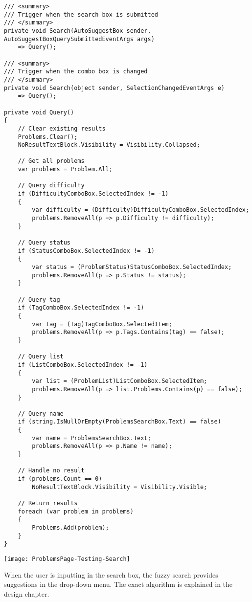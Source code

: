 \documentclass[report.tex]{subfiles}
\begin{document}
\begin{verbatim}
/// <summary>
/// Trigger when the search box is submitted
/// </summary>
private void Search(AutoSuggestBox sender, AutoSuggestBoxQuerySubmittedEventArgs args)
    => Query();

/// <summary>
/// Trigger when the combo box is changed
/// </summary>
private void Search(object sender, SelectionChangedEventArgs e)
    => Query();

private void Query()
{
    // Clear existing results
    Problems.Clear();
    NoResultTextBlock.Visibility = Visibility.Collapsed;
    
    // Get all problems
    var problems = Problem.All;

    // Query difficulty
    if (DifficultyComboBox.SelectedIndex != -1)
    {
        var difficulty = (Difficulty)DifficultyComboBox.SelectedIndex;
        problems.RemoveAll(p => p.Difficulty != difficulty);
    }

    // Query status
    if (StatusComboBox.SelectedIndex != -1)
    {
        var status = (ProblemStatus)StatusComboBox.SelectedIndex;
        problems.RemoveAll(p => p.Status != status);
    }

    // Query tag
    if (TagComboBox.SelectedIndex != -1)
    {
        var tag = (Tag)TagComboBox.SelectedItem;
        problems.RemoveAll(p => p.Tags.Contains(tag) == false);
    }

    // Query list
    if (ListComboBox.SelectedIndex != -1)
    {
        var list = (ProblemList)ListComboBox.SelectedItem;
        problems.RemoveAll(p => list.Problems.Contains(p) == false);
    }

    // Query name
    if (string.IsNullOrEmpty(ProblemsSearchBox.Text) == false)
    {
        var name = ProblemsSearchBox.Text;
        problems.RemoveAll(p => p.Name != name);
    }

    // Handle no result
    if (problems.Count == 0)
        NoResultTextBlock.Visibility = Visibility.Visible;

    // Return results
    foreach (var problem in problems)
    {
        Problems.Add(problem);
    }
}
\end{verbatim}

\texttt{[image: ProblemsPage-Testing-Search]}

When the user is inputting in the search box, the fuzzy search provides suggestions in the drop-down menu. The exact algorithm is explained in the design chapter.
\end{document}
